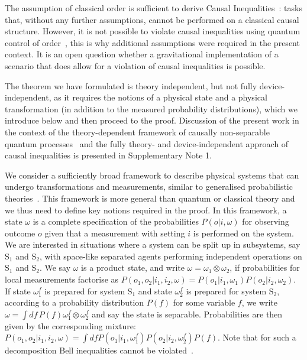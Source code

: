 \documentclass[a4paper,11pt]{article}
\begin{document}
The assumption of {classical order} is sufficient to derive {Causal Inequalities}~\cite{Oreshkov:2012, branciard16}: tasks that, without any further assumptions, cannot be performed on a classical causal structure. However, it is not possible to violate causal inequalities using quantum control of order~\cite{Oreshkov2015, araujo15}, this is why   additional assumptions were required in the present context. It is an open question whether a gravitational implementation of a scenario that does allow for a violation of causal inequalities is possible.

The theorem we have formulated {is} theory independent, but {not} fully device-independent, as it requires the notions of a physical state and a physical transformation (in addition to the measured probability distributions), which we introduce below and then proceed to the proof.
Discussion of the present work in the  context of the theory-dependent framework of causally non-separable quantum processes~\cite{Oreshkov:2012, araujo15, Oreshkov2015} and the fully theory- and device-independent approach of causal inequalities \cite{Oreshkov:2012, branciard16} is presented in Supplementary Note 1. %



We consider a sufficiently broad framework to describe physical systems that can undergo transformations and measurements, similar to generalised probabilistic theories~\cite{hardy2001quantum, Barrett2007, Chiribella2010}. {This framework is more general than quantum or classical theory and we thus need to define  key notions required in the proof.} In this framework, a state $\omega$ is a complete specification of the probabilities $P(o|i,\omega)$ for observing outcome $o$ given that a measurement with setting $i$ is performed on the system.
We are interested in situations where a system can be split up in subsystems, say $\mathrm S_1$ and $\mathrm S_2$, with space-like separated agents performing independent operations on $\mathrm S_1$ and $\mathrm S_2$. We say $\omega$ is a product state, and write $\omega =\omega_1\otimes \omega_2$, if probabilities for local measurements factorise as $P(o_1,o_2|i_1,i_2,\omega)= P(o_1|i_1,\omega_1)P(o_2|i_2,\omega_2)$. If state $\omega_1^f$ is prepared for system $\mathrm S_1$ and state $\omega_2^f$ is prepared for system $\mathrm S_2$, according to a probability distribution $P(f)$ for some variable $f$, we write $\omega=\int\! df\,P(f)\omega_1^f\otimes \omega_2^f$ and say the state is separable. Probabilities  are then given by the corresponding mixture: $P(o_1,o_2|i_1,i_2,\omega)= \int df P(o_1|i_1,\omega_1^f)P(o_2|i_2,\omega_2^f) P(f)$. Note that for such a decomposition Bell inequalities cannot be violated~\cite{bell64, fine82}.
\end{document}
